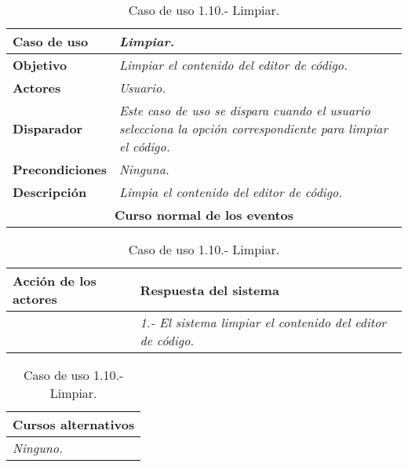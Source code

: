    \begin{table}[!ht] %
      \centering
      \begin{tabular}{|p{4cm}|p{11.5cm}|}
      \hline
      \textbf{Caso de uso} & \textit{Limpiar.}\\ \hline
      \textbf{Objetivo} & \textit{Limpiar el contenido del editor de código.}\\ \hline
      \textbf{Actores} & \textit{Usuario.}\\ \hline
      \textbf{Disparador} & \textit{Este caso de uso se dispara cuando el usuario selecciona la opción correspondiente para limpiar el código.}\\ \hline
      \textbf{Precondiciones} & \textit{Ninguna.}\\ \hline
      \textbf{Descripción} & \textit{Limpia el contenido del editor de código.}\\ \hline
      \multicolumn{2}{|c|}{\textbf{Curso normal de los eventos}}\\ \hline
    \end{tabular}
    \begin{tabular}{|p{7.75cm}|p{7.75cm}|}
      \hspace{2cm}\textbf{Acción de los actores} & \hspace{1.75cm}\textbf{Respuesta del sistema}\\ \hline 
            & \textit{1.- El sistema limpiar el contenido del editor de código.} \\ \hline
    \end{tabular}
    \begin{tabular}{|p{15.9cm}|}
      \hspace{6cm}\textbf{Cursos alternativos}\\ \hline     
      \textit{Ninguno.} \\ \hline
    \end{tabular}
    \caption{Caso de uso 1.10.- Limpiar.}
   \end{table}



